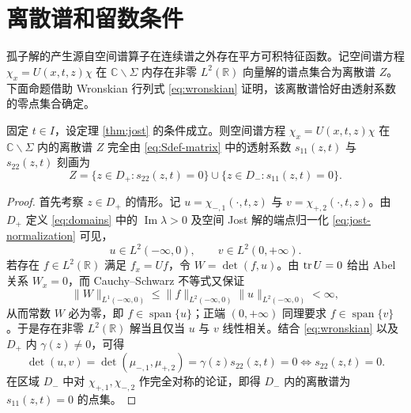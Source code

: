\section{离散谱和留数条件}\label{ch:discrete}

孤子解的产生源自空间谱算子在连续谱之外存在平方可积特征函数。记空间谱方程 $\chi_x=U(x,t,z)\chi$ 在 $\mathbb C\mathbin{\backslash}\Sigma$ 内存在非零 $L^2(\mathbb R)$ 向量解的谱点集合为离散谱 $Z$\cite{ZhangFan2020}。下面命题借助 Wronskian 行列式 \eqref{eq:wronskian} 证明，该离散谱恰好由透射系数的零点集合确定。

\begin{proposition}\label{prop:discrete-spectrum}
固定 $t\in I$，设定理 \ref{thm:jost} 的条件成立。则空间谱方程 $\chi_x=U(x,t,z)\chi$ 在 $\mathbb C\mathbin{\backslash}\Sigma$ 内的离散谱 $Z$ 完全由 \eqref{eq:Sdef-matrix} 中的透射系数 $s_{11}(z,t)$ 与 $s_{22}(z,t)$ 刻画为
\begin{equation*}
Z=\{z\in D_+:s_{22}(z,t)=0\}\cup\{z\in D_-:s_{11}(z,t)=0\}.
\end{equation*}
\end{proposition}
\begin{proof}
首先考察 $z\in D_+$ 的情形。记 $u=\chi_{-,1}(\cdot,t,z)$ 与 $v=\chi_{+,2}(\cdot,t,z)$。由 $D_+$ 定义 \eqref{eq:domains} 中的 $\operatorname{Im}\lambda>0$ 及空间 Jost 解的端点归一化 \eqref{eq:jost-normalization} 可见，
\begin{equation*}
u\in L^2(-\infty,0),\qquad v\in L^2(0,+\infty).
\end{equation*}
若存在 $f\in L^2(\mathbb R)$ 满足 $f_x=Uf$，令 $W=\det(f,u)$。由 $\operatorname{tr} U=0$ 给出 Abel 关系 $W_x=0$，而 Cauchy--Schwarz 不等式又保证
\begin{equation*}
\|W\|_{L^1(-\infty,0)}\le\|f\|_{L^2(-\infty,0)}\|u\|_{L^2(-\infty,0)}<\infty,
\end{equation*}
从而常数 $W$ 必为零，即 $f\in\operatorname{span}\{u\}$；正端 $(0,+\infty)$ 同理要求 $f\in\operatorname{span}\{v\}$。于是存在非零 $L^2(\mathbb R)$ 解当且仅当 $u$ 与 $v$ 线性相关。结合 \eqref{eq:wronskian} 以及 $D_+$ 内 $\gamma(z)\ne0$，可得
\begin{equation*}
\det(u,v)=\det(\mu_{-,1},\mu_{+,2})=\gamma(z)s_{22}(z,t)=0\Longleftrightarrow s_{22}(z,t)=0.
\end{equation*}
在区域 $D_-$ 中对 $\chi_{+,1},\chi_{-,2}$ 作完全对称的论证，即得 $D_-$ 内的离散谱为 $s_{11}(z,t)=0$ 的点集。
\end{proof}

